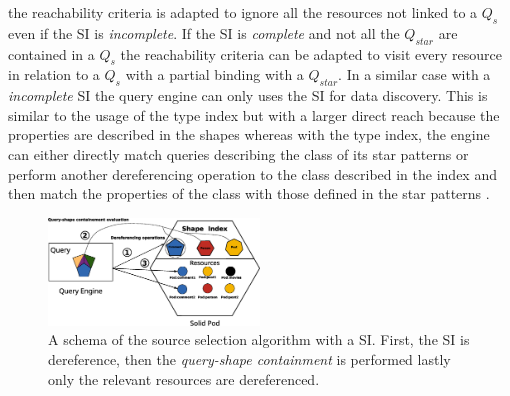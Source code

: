 the reachability criteria is adapted to ignore all the resources not linked to a $Q_{s}$ even if the SI is \emph{incomplete}.
If the SI is \emph{complete} and not all the $Q_{star}$ are contained in a $Q_{s}$ the reachability criteria can be adapted
to visit every resource in relation to a $Q_{s}$ with a partial binding with a $Q_{star}$.
In a similar case with a \emph{incomplete} SI the query engine can only uses the SI for data discovery.
This is similar to the usage of the type index but with a larger direct reach because the properties are described in the shapes
whereas with the type index, the engine can either directly match queries describing the class of its star patterns or perform
another dereferencing operation to the class described in the index and then match the properties of the class with those defined in the star patterns \cite{Taelman2023}.

\begin{figure}
    \centering
    \includegraphics[width=0.5\textwidth]{figure/shape_containement}
    \caption{A schema of the source selection algorithm with a SI. First, the SI is dereference, 
    then the \emph{query-shape containment} is performed lastly only the relevant resources are dereferenced.}
    \label{fig:shape_index}
\end{figure}